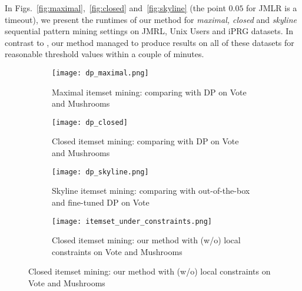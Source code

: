 In Figs.~\ref{fig:maximal},~\ref{fig:closed} and~\ref{fig:skyline} (the point $0.05$ for JMLR is a timeout), we present the runtimes of our method for \emph{maximal, closed} and \emph{skyline} sequential pattern mining settings on JMRL, Unix Users and iPRG datasets. In contrast to \textcite{DBLP:conf/ijcai/GebserGQ0S16}, our method managed to produce results on all of these datasets for reasonable threshold values within a couple of minutes.

\begin{figure}[tb]
  \centering
  \begin{subfigure}[t]{0.49\textwidth}
   \texttt{[image: dp\_maximal.png]}
   \caption{Maximal itemset mining: comparing with DP on Vote and Mushrooms}
    \label{fig:dp_maximal}
  \end{subfigure}
 \hfill
  \begin{subfigure}[t]{0.49\textwidth}
   \texttt{[image: dp\_closed]}
   \caption{Closed itemset mining: comparing with DP on Vote and Mushrooms}
    \label{fig:dp_closed}
  \end{subfigure}
 \hfill
  \begin{subfigure}[t]{0.49\textwidth}
   \texttt{[image: dp\_skyline.png]}
   \caption{Skyline itemset mining: comparing with out-of-the-box and fine-tuned DP on Vote}
    \label{fig:dp_skyline}
  \end{subfigure}
\hfill
  \begin{subfigure}[t]{0.49\textwidth}
   \texttt{[image: itemset\_under\_constraints.png]}
   \caption{Closed itemset mining: our method with (w/o) local constraints on Vote and Mushrooms}%
    \label{fig:local_constraints}
  \end{subfigure}
  \label{fig:qtwo_three}
\end{figure}


